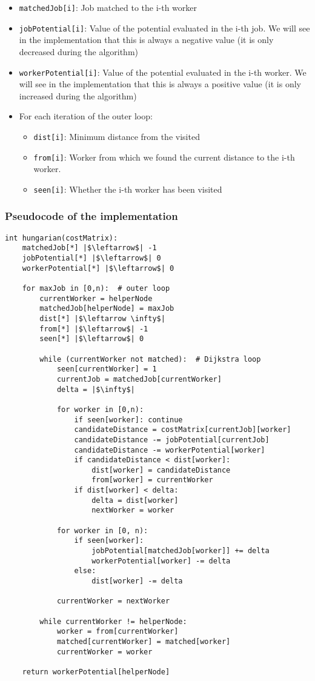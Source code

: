 \begin{itemize}
		\setlength{\itemsep}{0pt}
		\item \texttt{matchedJob[i]}: Job matched to the i-th worker
		\item \texttt{jobPotential[i]}: Value of the potential evaluated
				in the i-th job. We will see in the implementation that 
				this is always a negative value (it is only decreased during
				the algorithm)
		\item \texttt{workerPotential[i]}: Value of the potential evaluated
				in the i-th worker. We will see in the implementation that
				this is always a positive value (it is only increased during
				the algorithm)
		\item For each iteration of the outer loop:
		\begin{itemize}
				\vspace{-3pt}
				\setlength{\itemsep}{0pt}
				\item \texttt{dist[i]}: Minimum distance from the visited
				\item \texttt{from[i]}: Worker from which we found the current 
						distance to the i-th worker.
				\item \texttt{seen[i]}: Whether the i-th worker has been 
						visited
		\end{itemize}
\end{itemize}
\newpage
\subsubsection{Pseudocode of the implementation}
\begin{verbatim}
int hungarian(costMatrix):
	matchedJob[*] |$\leftarrow$| -1
	jobPotential[*] |$\leftarrow$| 0
	workerPotential[*] |$\leftarrow$| 0

	for maxJob in [0,n):  # outer loop
		currentWorker = helperNode
		matchedJob[helperNode] = maxJob
		dist[*] |$\leftarrow \infty$| 
		from[*] |$\leftarrow$| -1
		seen[*] |$\leftarrow$| 0
		
		while (currentWorker not matched):  # Dijkstra loop
			seen[currentWorker] = 1
			currentJob = matchedJob[currentWorker]
			delta = |$\infty$|

			for worker in [0,n):
				if seen[worker]: continue
				candidateDistance = costMatrix[currentJob][worker]
				candidateDistance -= jobPotential[currentJob]
				candidateDistance -= workerPotential[worker]
				if candidateDistance < dist[worker]:
					dist[worker] = candidateDistance
					from[worker] = currentWorker
				if dist[worker] < delta:
					delta = dist[worker]
					nextWorker = worker

			for worker in [0, n):	
				if seen[worker]:
					jobPotential[matchedJob[worker]] += delta
					workerPotential[worker] -= delta
				else:
					dist[worker] -= delta

			currentWorker = nextWorker
		
		while currentWorker != helperNode:
			worker = from[currentWorker]
			matched[currentWorker] = matched[worker]
			currentWorker = worker

	return workerPotential[helperNode]

\end{verbatim}
\newpage
